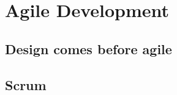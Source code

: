 \section{Agile Development} \label{sec:agile_development}

\begin{concept} \label{conc:agile} 
  
\end{concept}

\subsection{Design comes before agile} \label{sec:design_before_agile}

\subsection{Scrum} \label{sec:scrum}

\begin{definition} \label{def:product_owner} 

\end{definition}

\begin{definition} \label{def:scrum_master} 

\end{definition}

\begin{definition} \label{def:product_backlog} 

\end{definition}

\begin{definition}[Sprint] \label{def:sprint} 

\end{definition}

\begin{definition} \label{def:sprint_backlog} 

\end{definition}

\begin{definition} \label{def:daily_scrum} 

\end{definition}

\begin{definition}  \label{def:sprint_review} 

\end{definition}
